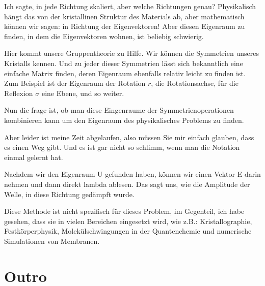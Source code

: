 \documentclass[a4paper]{article}
\newcommand{\scene}[1]{\par\noindent[ #1 ]\par}
\begin{document}
Ich sagte, in jede Richtung skaliert, aber welche Richtungen genau?
Physikalisch hängt das von der kristallinen Struktur des Materials ab, aber
mathematisch können wir sagen: in Richtung der Eigenvektoren!  Aber diesen
Eigenraum zu finden, in dem die Eigenvektoren wohnen, ist beliebig schwierig. 

Hier kommt unsere Gruppentheorie zu Hilfe. Wir können die Symmetrien unseres
Kristalls kennen. Und zu jeder dieser Symmetrien lässt sich bekanntlich eine
einfache Matrix finden, deren Eigenraum ebenfalls relativ leicht zu finden ist.
Zum Beispiel ist der Eigenraum der Rotation \(r\), die Rotationsachse, für die
Reflexion \(\sigma\) eine Ebene, und so weiter.

Nun die frage ist, ob man diese Eingenraume der Symmetrienoperationen
kombinieren kann um den Eigenraum des physikalisches Problems zu finden.

Aber leider ist meine Zeit abgelaufen, also müssen Sie mir einfach glauben,
dass es einen Weg gibt. Und es ist gar nicht so schlimm, wenn man die Notation
einmal gelernt hat.

Nachdem wir den Eigenraum U gefunden haben, können wir einen Vektor E darin
nehmen und dann direkt lambda ablesen. Das sagt uns, wie die Amplitude der
Welle, in diese Richtung gedämpft wurde.

Diese Methode ist nicht spezifisch für dieses Problem, im Gegenteil, ich habe
gesehen, dass sie in vielen Bereichen eingesetzt wird, wie z.B.:
Kristallographie, Festkörperphysik, Molekülschwingungen in der Quantenchemie
und numerische Simulationen von Membranen.

\section{Outro}
\scene{Camera}
\end{document}
